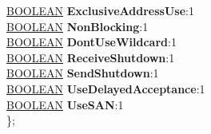 \begin{DoxyCompactItemize}
\begin{tabbing}
\>\hyperlink{_processor_bind_8h_a112e3146cb38b6ee95e64d85842e380a}{BOOLEAN} {\bfseries ExclusiveAddressUse}:1\\
\>\hyperlink{_processor_bind_8h_a112e3146cb38b6ee95e64d85842e380a}{BOOLEAN} {\bfseries NonBlocking}:1\\
\>\hyperlink{_processor_bind_8h_a112e3146cb38b6ee95e64d85842e380a}{BOOLEAN} {\bfseries DontUseWildcard}:1\\
\>\hyperlink{_processor_bind_8h_a112e3146cb38b6ee95e64d85842e380a}{BOOLEAN} {\bfseries ReceiveShutdown}:1\\
\>\hyperlink{_processor_bind_8h_a112e3146cb38b6ee95e64d85842e380a}{BOOLEAN} {\bfseries SendShutdown}:1\\
\>\hyperlink{_processor_bind_8h_a112e3146cb38b6ee95e64d85842e380a}{BOOLEAN} {\bfseries UseDelayedAcceptance}:1\\
\>\hyperlink{_processor_bind_8h_a112e3146cb38b6ee95e64d85842e380a}{BOOLEAN} {\bfseries UseSAN}:1\\
\}; \\


\end{tabbing}
\end{DoxyCompactItemize}
